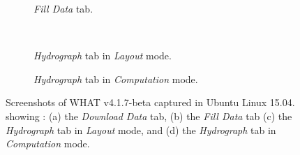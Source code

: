 \documentclass[WHATMANUAL.tex]{subfiles}
\begin{document}
\begin{figure}[!ht]
\begin{subfigure}[t]{0.45\textwidth}
        \caption{\emph{Fill Data} tab.}
        \label{subfig:ScnShot_001}
    \end{subfigure}
    \\[0.5cm]
    \begin{subfigure}[t]{0.45\textwidth}
        \setlength{\fboxsep}{0pt}
        \caption{\emph{Hydrograph} tab in \emph{Layout} mode.}
        \label{subfig:ScnShot_002}
    \end{subfigure}
    \hspace{0.5cm}
    \begin{subfigure}[t]{0.45\textwidth}
        \setlength{\fboxsep}{0pt}
        \caption{\emph{Hydrograph} tab in \emph{Computation} mode.}
        \label{subfig:ScnShot_003}
    \end{subfigure}
    \caption[Screenshots of WHAT v4.1.7-beta captured in Ubuntu Linux 15.04.]{Screenshots of WHAT v4.1.7-beta captured in Ubuntu Linux 15.04. showing : (a) the \emph{Download Data} tab, (b) the \emph{Fill Data} tab (c) the \emph{Hydrograph} tab in \emph{Layout} mode, and (d) the \emph{Hydrograph} tab in \emph{Computation} mode.}\label{fig:WHAT_GUI_ScnShot}
\end{figure}
\end{document}
